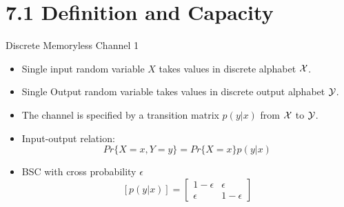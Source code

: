 \documentclass[../main.tex]{subfiles}
\begin{document}
\section{7.1 Definition and Capacity}
 \begin{pbox}{Discrete Memoryless Channel 1}
\begin{itemize}
    \item Single input random variable $X$ takes values in discrete alphabet $\mathcal{X}$.
    \item Single Output random variable takes values in discrete output alphabet $\mathcal{Y}$.
    \item The channel is specified by a transition matrix $p(y|x)$ from $\mathcal{X}$ to $\mathcal{Y}$.
    \item Input-output relation: \[
    Pr\{X=x, Y=y\}=Pr\{X=x\} p(y|x)
    \]
    \item BSC with cross probability $\epsilon$ \[
    [p(y|x)]=\begin{bmatrix}
        1-\epsilon & \epsilon\\
        \epsilon & 1- \epsilon
    \end{bmatrix}
    \]
\end{itemize}
 \end{pbox}
\end{document}
